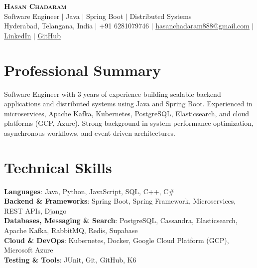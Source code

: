 \documentclass[letterpaper,11pt]{article}
\begin{document}
\begin{center}
    \textbf{\Huge \scshape Hasan Chadaram} \\ \vspace{4pt}
    \small Software Engineer $|$ Java $|$ Spring Boot $|$ Distributed Systems \\ \vspace{3pt}
    \small Hyderabad, Telangana, India $|$
    +91 6281079746 $|$
    \href{mailto:hasanchadaram888@gmail.com}{\underline{hasanchadaram888@gmail.com}} $|$
    \href{https://linkedin.com/in/hasan-chadaram}{\underline{LinkedIn}} $|$
    \href{https://github.com/hasanchadaram}{\underline{GitHub}}
\end{center}

\vspace{-14pt}
\section{Professional Summary}
\vspace{-1pt}
  \small{Software Engineer with 3 years of experience building scalable backend applications and distributed systems using Java and Spring Boot. Experienced in microservices, Apache Kafka, Kubernetes, PostgreSQL, Elasticsearch, and cloud platforms (GCP, Azure). Strong background in system performance optimization, asynchronous workflows, and event-driven architectures.}

\vspace{-4pt}
\section{Technical Skills}
\vspace{-2pt}
 \begin{itemize}[leftmargin=0.15in, label={}]
    \small{\item{
     \textbf{Languages}{: Java, Python, JavaScript, SQL, C++, C\#} \\
     \textbf{Backend \& Frameworks}{: Spring Boot, Spring Framework, Microservices, REST APIs, Django} \\
     \textbf{Databases, Messaging \& Search}{: PostgreSQL, Cassandra, Elasticsearch, Apache Kafka, RabbitMQ, Redis, Supabase} \\
     \textbf{Cloud \& DevOps}{: Kubernetes, Docker, Google Cloud Platform (GCP), Microsoft Azure} \\
     \textbf{Testing \& Tools}{: JUnit, Git, GitHub, K6}
    }}
 \end{itemize}
\end{document}
